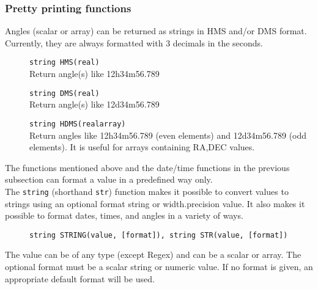 \subsubsection{Pretty printing functions}
Angles (scalar or array) can be returned as strings in HMS and/or DMS
format. Currently, they are always formatted with 3 decimals in the seconds.
\begin{description}
  \item[] \texttt{string HMS(real)}\\
    Return angle(s) like 12h34m56.789
  \item[] \texttt{string DMS(real)}\\
    Return angle(s) like 12d34m56.789
  \item[] \texttt{string HDMS(realarray)}\\
    Return angles like 12h34m56.789 (even elements) and 12d34m56.789
    (odd elements). It is useful for arrays containing RA,DEC values.
\end{description}
The functions mentioned above and the date/time functions in the previous
subsection can format a value in a predefined way only.
\\The \texttt{string} (shorthand \texttt{str}) function makes it possible to convert values to
strings using an optional format string or width.precision
value. It also makes it possible to format dates, times, and angles
in a variety of ways.
\begin{description}
  \item[] \texttt{string STRING(value, [format]),    string STR(value, [format])}
\end{description}
The value can be of any type (except Regex) and can be a scalar or
array. The optional format must be a scalar string or numeric value.
If no format is given, an appropriate default format will be used.
